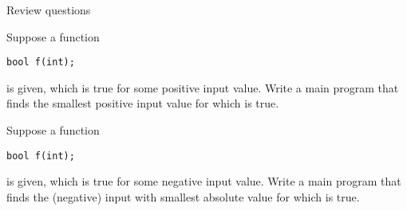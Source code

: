  {Review questions}

\begin{exercise}
  \label{ex:cpp-funcloop1}
  Suppose a function
\begin{verbatim}
bool f(int);
\end{verbatim}
is given, which is true for some positive input value. Write a main program that
finds the smallest positive input value for which  is true.
\end{exercise}

\begin{exercise}
  \label{ex:cpp-funcloop2}
  Suppose a function
\begin{verbatim}
bool f(int);
\end{verbatim}
is given, which is true for some negative input value. Write a main program that
finds the (negative) input with smallest absolute value for which  is true.
\end{exercise}
